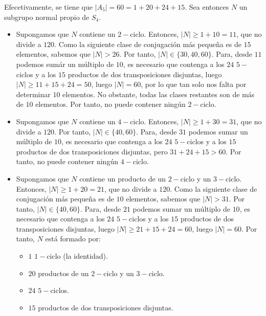\begin{ejercicio}
\begin{enumerate}
        Efecetivamente, se tiene que $|A_5|=60=1+20+24+15$. Sea entonces $N$ un subgrupo normal propio de $S_4$.
        \begin{itemize}
            \item Supongamos que $N$ contiene un $2-$ciclo. Entonces, $|N|\geq 1+10=11$, que no divide a $120$. Como la siguiente clase de conjugación más pequeña es de $15$ elementos, sabemos que $|N|>26$. Por tanto, $|N|\in \{30,40,60\}$. Para, desde $11$ podemos sumár un múltiplo de $10$, es necesario que contenga a los $24$ $5-$ciclos y a los $15$ productos de dos transposiciones disjuntas, luego $|N|\geq 11+15+24=50$, luego $|N|=60$, por lo que tan solo nos falta por determinar $10$ elementos. No obstante, todas las clases restantes son de más de $10$ elementos. Por tanto, no puede contener ningún $2-$ciclo.
            
            \item Supongamos que $N$ contiene un $4-$ciclo. Entonces, $|N|\geq 1+30=31$, que no divide a $120$. Por tanto, $|N|\in \{40,60\}$. Para, desde $31$ podemos sumar un múltiplo de $10$, es necesario que contenga a los $24$ $5-$ciclos y a los $15$ productos de dos transposiciones disjuntas, pero $31+24+15>60$. Por tanto, no puede contener ningún $4-$ciclo.
            

            \item Supongamos que $N$ contiene un producto de un $2-$ciclo y un $3-$ciclo. Entonces, $|N|\geq 1+20=21$, que no divide a $120$. Como la siguiente clase de conjugación más pequeña es de $10$ elementos, sabemos que $|N|>31$. Por tanto, $|N|\in \{40,60\}$. Para, desde $21$ podemos sumar un múltiplo de $10$, es necesario que contenga a los $24$ $5-$ciclos y a los $15$ productos de dos transposiciones disjuntas, luego $|N|\geq 21+15+24=60$, luego $|N|=60$. Por tanto, $N$ está formado por:
            \begin{itemize}
                \item $1$ $1-$ciclo (la identidad).
                \item $20$ productos de un $2-$ciclo y un $3-$ciclo.
                \item $24$ $5-$ciclos.
                \item $15$ productos de dos transposiciones disjuntas.
            \end{itemize}


\end{itemize}
\end{enumerate}
\end{ejercicio}
